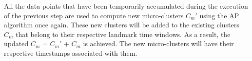 \begin{itemize}[leftmargin=*]
    
    
    
    
    
    All the data points that have been temporarily accumulated during the execution of the previous step are used to compute new micro-clusters $C_m'$ using the AP algorithm once again. These new clusters will be added to the existing clusters $C_m$ that belong to their respective landmark time windows. As a result, the updated $C_m$ = $C_m'$ + $C_m$ is achieved. The new micro-clusters will have their respective timestamps associated with them.
    


\end{itemize}

